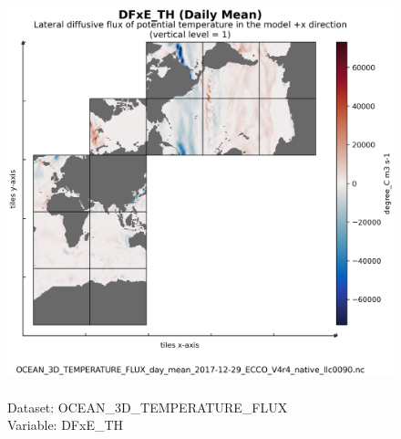 \begin{figure}[H]
\centering
\includegraphics[scale=0.5]{../images/plots/native_plots/Ocean_Three-Dimensional_Potential_Temperature_Fluxes/DFxE_TH.png}
\caption{\\Dataset: OCEAN\_3D\_TEMPERATURE\_FLUX\\Variable: DFxE\_TH}
\label{tab:table-OCEAN_3D_TEMPERATURE_FLUX_DFxE_TH-Plot}
\end{figure}
\pagebreak
